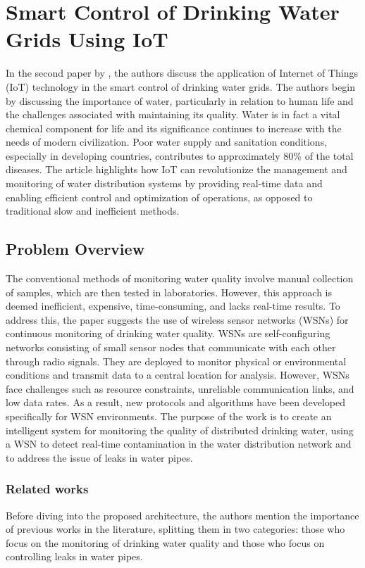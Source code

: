 \documentclass[draft, {\secondLanguage}, english]{volcanica-template}
\begin{document}
\section{Smart Control of Drinking Water Grids Using IoT}
In the second paper by \cite{Dziri2023}, the authors discuss the application of Internet of Things (IoT) technology in the smart control of drinking water grids. The authors begin by discussing the importance of water, particularly in relation to human life and the challenges associated with maintaining its quality. Water is in fact a vital chemical component for life and its significance continues to increase with the needs of modern civilization. Poor water supply and sanitation conditions, especially in developing countries, contributes to approximately 80\% of the total diseases. The article highlights how IoT can revolutionize the management and monitoring of water distribution systems by providing real-time data and enabling efficient control and optimization of operations, as opposed to traditional slow and inefficient methods.

\subsection{Problem Overview}
The conventional methods of monitoring water quality involve manual collection of samples, which are then tested in laboratories. However, this approach is deemed inefficient, expensive, time-consuming, and lacks real-time results. To address this, the paper suggests the use of wireless sensor networks (WSNs) for continuous monitoring of drinking water quality. WSNs are self-configuring networks consisting of small sensor nodes that communicate with each other through radio signals. They are deployed to monitor physical or environmental conditions and transmit data to a central location for analysis. However, WSNs face challenges such as resource constraints, unreliable communication links, and low data rates. As a result, new protocols and algorithms have been developed specifically for WSN environments. The purpose of the work is to create an intelligent system for monitoring the quality of distributed drinking water, using a WSN to detect real-time contamination in the water distribution network and to address the issue of leaks in water pipes.

\subsubsection{Related works}
Before diving into the proposed architecture, the authors mention the importance of previous works in the literature, splitting them in two categories: those who focus on the monitoring of drinking water quality and those who focus on controlling leaks in water pipes.
\end{document}
